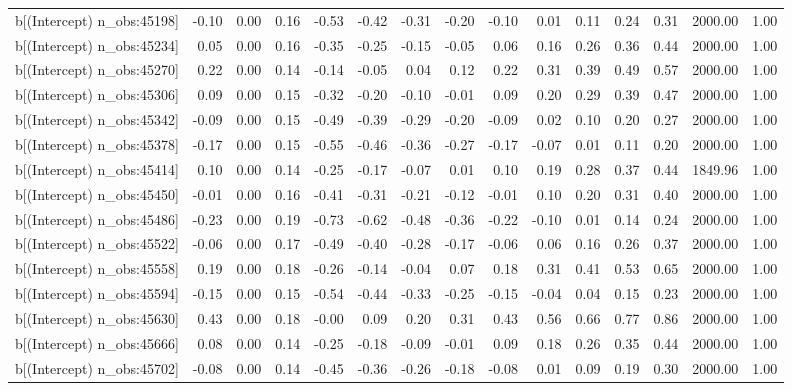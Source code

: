 \begin{table}[ht]
\begin{tabular}{rrrrrrrrrrrrrrr}
  b[(Intercept) n\_obs:45198] & -0.10 & 0.00 & 0.16 & -0.53 & -0.42 & -0.31 & -0.20 & -0.10 & 0.01 & 0.11 & 0.24 & 0.31 & 2000.00 & 1.00 \\ 
  b[(Intercept) n\_obs:45234] & 0.05 & 0.00 & 0.16 & -0.35 & -0.25 & -0.15 & -0.05 & 0.06 & 0.16 & 0.26 & 0.36 & 0.44 & 2000.00 & 1.00 \\ 
  b[(Intercept) n\_obs:45270] & 0.22 & 0.00 & 0.14 & -0.14 & -0.05 & 0.04 & 0.12 & 0.22 & 0.31 & 0.39 & 0.49 & 0.57 & 2000.00 & 1.00 \\ 
  b[(Intercept) n\_obs:45306] & 0.09 & 0.00 & 0.15 & -0.32 & -0.20 & -0.10 & -0.01 & 0.09 & 0.20 & 0.29 & 0.39 & 0.47 & 2000.00 & 1.00 \\ 
  b[(Intercept) n\_obs:45342] & -0.09 & 0.00 & 0.15 & -0.49 & -0.39 & -0.29 & -0.20 & -0.09 & 0.02 & 0.10 & 0.20 & 0.27 & 2000.00 & 1.00 \\ 
  b[(Intercept) n\_obs:45378] & -0.17 & 0.00 & 0.15 & -0.55 & -0.46 & -0.36 & -0.27 & -0.17 & -0.07 & 0.01 & 0.11 & 0.20 & 2000.00 & 1.00 \\ 
  b[(Intercept) n\_obs:45414] & 0.10 & 0.00 & 0.14 & -0.25 & -0.17 & -0.07 & 0.01 & 0.10 & 0.19 & 0.28 & 0.37 & 0.44 & 1849.96 & 1.00 \\ 
  b[(Intercept) n\_obs:45450] & -0.01 & 0.00 & 0.16 & -0.41 & -0.31 & -0.21 & -0.12 & -0.01 & 0.10 & 0.20 & 0.31 & 0.40 & 2000.00 & 1.00 \\ 
  b[(Intercept) n\_obs:45486] & -0.23 & 0.00 & 0.19 & -0.73 & -0.62 & -0.48 & -0.36 & -0.22 & -0.10 & 0.01 & 0.14 & 0.24 & 2000.00 & 1.00 \\ 
  b[(Intercept) n\_obs:45522] & -0.06 & 0.00 & 0.17 & -0.49 & -0.40 & -0.28 & -0.17 & -0.06 & 0.06 & 0.16 & 0.26 & 0.37 & 2000.00 & 1.00 \\ 
  b[(Intercept) n\_obs:45558] & 0.19 & 0.00 & 0.18 & -0.26 & -0.14 & -0.04 & 0.07 & 0.18 & 0.31 & 0.41 & 0.53 & 0.65 & 2000.00 & 1.00 \\ 
  b[(Intercept) n\_obs:45594] & -0.15 & 0.00 & 0.15 & -0.54 & -0.44 & -0.33 & -0.25 & -0.15 & -0.04 & 0.04 & 0.15 & 0.23 & 2000.00 & 1.00 \\ 
  b[(Intercept) n\_obs:45630] & 0.43 & 0.00 & 0.18 & -0.00 & 0.09 & 0.20 & 0.31 & 0.43 & 0.56 & 0.66 & 0.77 & 0.86 & 2000.00 & 1.00 \\ 
  b[(Intercept) n\_obs:45666] & 0.08 & 0.00 & 0.14 & -0.25 & -0.18 & -0.09 & -0.01 & 0.09 & 0.18 & 0.26 & 0.35 & 0.44 & 2000.00 & 1.00 \\ 
  b[(Intercept) n\_obs:45702] & -0.08 & 0.00 & 0.14 & -0.45 & -0.36 & -0.26 & -0.18 & -0.08 & 0.01 & 0.09 & 0.19 & 0.30 & 2000.00 & 1.00 \\ 

\end{tabular}
\end{table}

